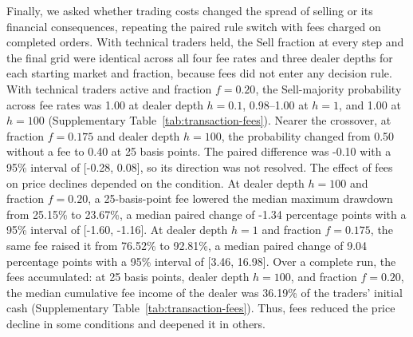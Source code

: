 Finally, we asked whether trading costs changed the spread of selling or
its financial consequences, repeating the paired rule switch with fees
charged on completed orders. With technical traders held, the Sell
fraction at every step and the final grid were identical across all four
fee rates and three dealer depths for each starting market and fraction,
because fees did not enter any decision rule.
With technical traders active and fraction $f=0.20$, the Sell-majority
probability across fee rates was 1.00 at dealer depth $h=0.1$, 0.98--1.00 at $h=1$, and 1.00 at $h=100$
(Supplementary Table~\ref{tab:transaction-fees}). Nearer the crossover,
at fraction $f=0.175$ and dealer depth $h=100$, the probability changed
from 0.50 without a fee to 0.40 at 25 basis points. The paired
difference was -0.10 with a 95\% interval of [-0.28, 0.08],
so its direction was not resolved. The effect of fees on price declines
depended on the condition. At dealer depth $h=100$ and fraction $f=0.20$,
a 25-basis-point fee lowered the median maximum drawdown from 25.15\% to
23.67\%, a median paired change of -1.34 percentage points with a
95\% interval of [-1.60, -1.16]. At dealer depth $h=1$ and fraction
$f=0.175$, the same fee raised it from 76.52\% to 92.81\%, a
median paired change of 9.04 percentage points with a 95\% interval of
[3.46, 16.98]. Over a complete run, the fees accumulated: at 25 basis
points, dealer depth $h=100$, and fraction $f=0.20$, the median
cumulative fee income of the dealer was 36.19\% of the traders' initial
cash (Supplementary Table~\ref{tab:transaction-fees}). Thus, fees reduced
the price decline in some conditions and deepened it in others.
